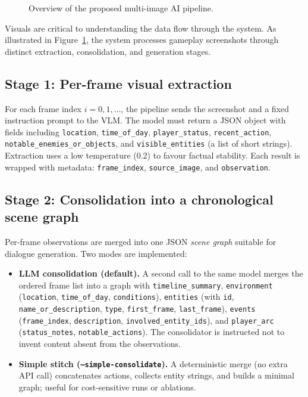 \documentclass[11pt]{article}
\begin{document}
\begin{figure}[htbp]
  \centering
  \caption{Overview of the proposed multi-image AI pipeline.}
  \label{fig:architecture}
\end{figure}

Visuals are critical to understanding the data flow through the system. As illustrated in Figure~\ref{fig:architecture}, the system processes gameplay screenshots through distinct extraction, consolidation, and generation stages.

\subsection{Stage 1: Per-frame visual extraction}

For each frame index $i = 0,1,\ldots$, the pipeline sends the screenshot and a fixed instruction prompt to the VLM. The model must return a JSON object with fields including \texttt{location}, \texttt{time\_of\_day}, \texttt{player\_status}, \texttt{recent\_action}, \texttt{notable\_enemies\_or\_objects}, and \texttt{visible\_entities} (a list of short strings). Extraction uses a low temperature (0.2) to favour factual stability. Each result is wrapped with metadata: \texttt{frame\_index}, \texttt{source\_image}, and \texttt{observation}.

\subsection{Stage 2: Consolidation into a chronological scene graph}

Per-frame observations are merged into one JSON \emph{scene graph} suitable for dialogue generation. Two modes are implemented:

\begin{itemize}
  \item \textbf{LLM consolidation (default).} A second call to the same model merges the ordered frame list into a graph with \texttt{timeline\_summary}, \texttt{environment} (\texttt{location}, \texttt{time\_of\_day}, \texttt{conditions}), \texttt{entities} (with \texttt{id}, \texttt{name\_or\_description}, \texttt{type}, \texttt{first\_frame}, \texttt{last\_frame}), \texttt{events} (\texttt{frame\_index}, \texttt{description}, \texttt{involved\_entity\_ids}), and \texttt{player\_arc} (\texttt{status\_notes}, \texttt{notable\_actions}). The consolidator is instructed not to invent content absent from the observations.
  \item \textbf{Simple stitch (\texttt{--simple-consolidate}).} A deterministic merge (no extra API call) concatenates actions, collects entity strings, and builds a minimal graph; useful for cost-sensitive runs or ablations.
\end{itemize}
\end{document}
